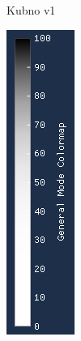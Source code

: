 \documentclass[times, utf8, diplomski]{fer}
\begin{document}
\begin{figure} [H]
\begin{subfigure}[h]{0.17\textwidth}
         \caption{Kubno v1}
         \label{fig:cubic_legend}
     \end{subfigure}
     \hfill
     \begin{subfigure}[h]{0.17\textwidth}
         \centering
         \includegraphics[width=\textwidth]{quartic_colormap.png}

\end{subfigure}
\end{figure}
\end{document}

